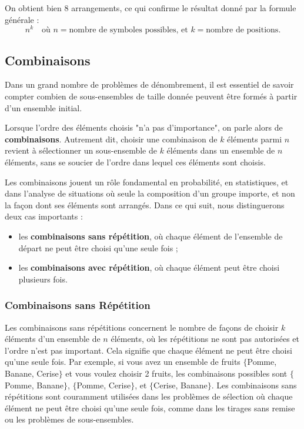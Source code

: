 \documentclass[12pt]{article}
\newcommand{\espace}{\vspace{1.5em}}
\newcommand{\petitespace}{\vspace{0.5cm}}
\newcommand{\1}{\bb{1}} %
\begin{document}
On obtient bien $8$ arrangements, ce qui confirme le résultat donné par la formule générale :
\[
n^k \quad \text{où } n = \text{nombre de symboles possibles, et } k = \text{nombre de positions.}
\]

\petitespace

\subsection{Combinaisons}\espace

Dans un grand nombre de problèmes de dénombrement, il est essentiel de savoir compter combien de sous-ensembles de taille donnée peuvent être formés à partir d’un ensemble initial. 

Lorsque l’ordre des éléments choisis "n’a pas d’importance", on parle alors de \textbf{combinaisons}. Autrement dit, choisir une combinaison de $k$ éléments parmi $n$ revient à sélectionner un sous-ensemble de $k$ éléments dans un ensemble de $n$ éléments, sans se soucier de l’ordre dans lequel ces éléments sont choisis.

Les combinaisons jouent un rôle fondamental en probabilité, en statistiques, et dans l’analyse de situations où seule la composition d’un groupe importe, et non la façon dont ses éléments sont arrangés. Dans ce qui suit, nous distinguerons deux cas importants :
\begin{itemize}
    \item les \textbf{combinaisons sans répétition}, où chaque élément de l’ensemble de départ ne peut être choisi qu’une seule fois ;
    \item les \textbf{combinaisons avec répétition}, où chaque élément peut être choisi plusieurs fois.
\end{itemize}

\petitespace

\subsubsection{Combinaisons sans Répétition}\petitespace

Les combinaisons sans répétitions concernent le nombre de façons de choisir $k$ éléments d'un ensemble de $n$ éléments, où les répétitions ne sont pas autorisées et l'ordre n'est pas important. Cela signifie que chaque élément ne peut être choisi qu'une seule fois. Par exemple, si vous avez un ensemble de fruits $\{$Pomme, Banane, Cerise$\}$ et vous voulez choisir 2 fruits, les combinaisons possibles sont $\{$Pomme, Banane$\}$, $\{$Pomme, Cerise$\}$, et $\{$Cerise, Banane$\}$.  Les combinaisons sans répétitions sont couramment utilisées dans les problèmes de sélection où chaque élément ne peut être choisi qu'une seule fois, comme dans les tirages sans remise ou les problèmes de sous-ensembles. \petitespace
\end{document}
